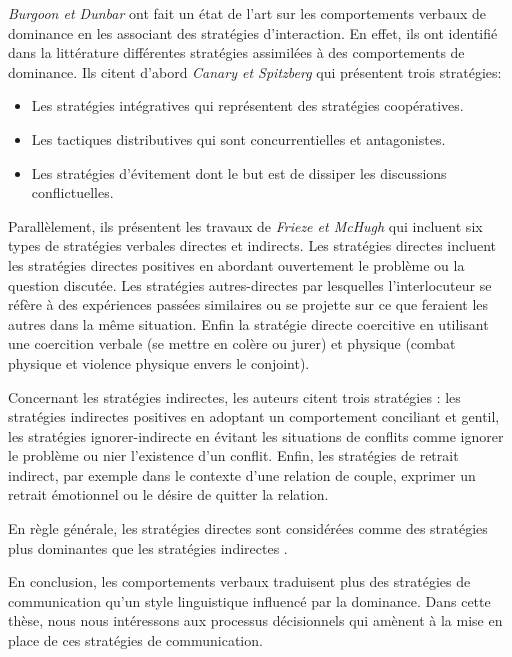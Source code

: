 			\emph{Burgoon et Dunbar} \cite{dunbar2005perceptions} ont fait un état de l'art sur les comportements verbaux de dominance en les associant des stratégies d'interaction. En effet, ils ont identifié dans la littérature différentes stratégies assimilées à des comportements de dominance. Ils citent d'abord \emph{Canary et Spitzberg} \cite{canary1987} qui présentent trois stratégies: 
			\begin{itemize}
				\item Les stratégies intégratives qui représentent des stratégies coopératives.
				\item Les tactiques distributives qui sont concurrentielles et antagonistes.
				\item Les stratégies d'évitement dont le but est de dissiper les discussions conflictuelles. 
			\end{itemize}
			
			Parallèlement, ils présentent les travaux de \emph{Frieze et McHugh} \cite{frieze1992power} qui incluent six types de stratégies verbales directes et indirects. 
			Les stratégies directes incluent les stratégies	directes positives en abordant ouvertement le problème ou la question discutée. Les stratégies autres-directes par lesquelles l'interlocuteur se réfère à des expériences passées similaires ou se projette sur ce que feraient les autres dans la même situation. Enfin la stratégie directe coercitive en utilisant une coercition verbale (se mettre en colère ou jurer) et physique (combat physique et violence physique envers le conjoint). 
			
			Concernant les stratégies indirectes, les auteurs citent trois stratégies : les stratégies indirectes positives en adoptant un comportement conciliant et gentil, les stratégies ignorer-indirecte en évitant les situations de conflits comme ignorer le problème ou nier l'existence d'un conflit. Enfin, les stratégies de retrait indirect, par exemple dans le contexte d'une relation de couple, exprimer un retrait émotionnel ou le désire de quitter la relation. 
		
			En règle générale, les stratégies directes sont considérées comme des stratégies plus dominantes que les stratégies indirectes \cite{dunbar2005perceptions}.
			
			En conclusion, les comportements verbaux traduisent plus des stratégies de communication qu'un style linguistique influencé par la dominance. Dans cette thèse, nous nous intéressons aux processus décisionnels qui amènent à la mise en place de ces stratégies de communication. 
			
